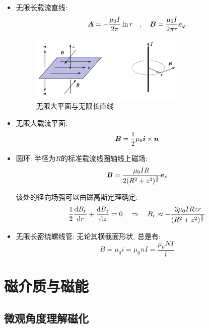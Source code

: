\begin{itemize}
\item 无限长载流直线:
\[\boldsymbol{A}=-\frac{\mu_0 I}{2\pi}\ln r\quad ,\quad \boldsymbol{B}=\frac{\mu_0 I}{2\pi r}\boldsymbol{e}_\varphi\]

\begin{figure}[H]
\centering
\includegraphics[width=0.7\textwidth]{image/7-4-1.png}
\caption{无限大平面与无限长直线}\label{fig7-4-1}
\end{figure}

\item 无限大载流平面:
\[\boldsymbol{B}=\frac{1}{2}\mu_0\boldsymbol{i}\times \boldsymbol{n}\]

\item 圆环: 半径为$R$的标准载流线圈轴线上磁场:
\[\boldsymbol{B}=\frac{\mu_0IR}{2(R^2+z^2)^{\frac{3}{2}}}\boldsymbol{e}_z\]

该处的径向场强可以由磁高斯定理确定:
\[\frac{1}{2}\frac{\textrm{d} B_r}{\textrm{d} r}+\frac{\textrm{d} B_z}{\textrm{d} z}=0\quad \Rightarrow \quad B_r\approx -\frac{3\mu_0IRzr}{(R^2+z^2)^{\frac{5}{2}}}\]

\item 无限长密绕螺线管: 无论其横截面形状, 总是有:
\[B=\mu_0 i=\mu_0 nI=\frac{\mu_0 NI}{l}\]
\end{itemize}


\npg{-2cm}

\section{磁介质与磁能}

\subsection{微观角度理解磁化}

